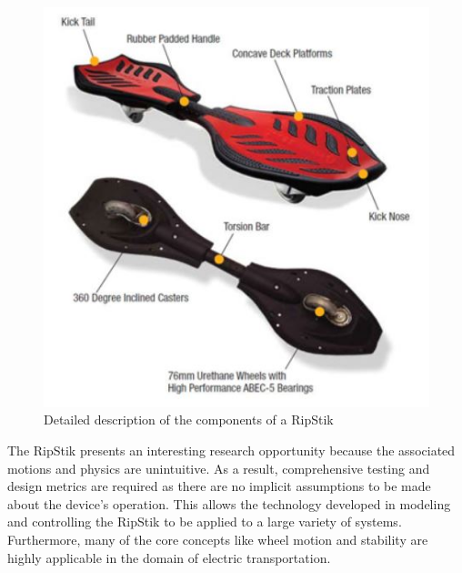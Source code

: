 \begin{figure}[!htb]
	\centering
	\includegraphics[width=\linewidth]{RipStik.JPG}
	\caption{Detailed description of the components of a RipStik \cite{PIC}}\label{fig:RipStik}
	\endminipage
\end{figure}
\par
The RipStik presents an interesting research opportunity because the associated motions and physics are unintuitive.
As a result, comprehensive testing and design metrics are required as there are no implicit assumptions to be made about the device's operation. 
This allows the technology developed in modeling and controlling the RipStik to be applied to a large variety of systems. 
Furthermore, many of the core concepts like wheel motion and stability are highly applicable in the domain of electric transportation. 

